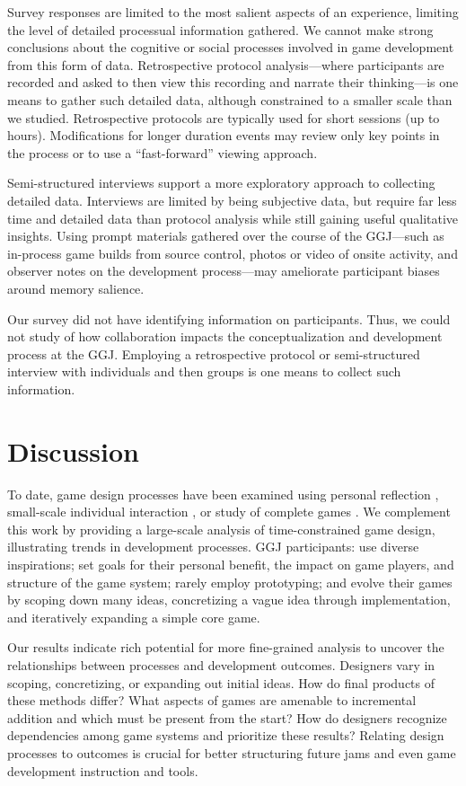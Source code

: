 \documentclass{sig-alternate}
\begin{document}
Survey responses are limited to the most salient aspects of an experience, limiting the level of detailed processual information gathered. We cannot make strong conclusions about the cognitive or social processes involved in game development from this form of data. Retrospective protocol analysis---where participants are recorded and asked to then view this recording and narrate their thinking---is one means to gather such detailed data, although constrained to a smaller scale than we studied. Retrospective protocols are typically used for short sessions (up to hours). Modifications for longer duration events may review only key points in the process or to use a ``fast-forward'' viewing approach. 

Semi-structured interviews support a more exploratory approach to collecting detailed data. Interviews are limited by being subjective data, but require far less time and detailed data than protocol analysis while still gaining useful qualitative insights. Using prompt materials gathered over the course of the GGJ---such as in-process game builds from source control, photos or video of onsite activity, and observer notes on the development process---may ameliorate participant biases around memory salience.

Our survey did not have identifying information on participants. Thus, we could not study of how collaboration impacts the conceptualization and development process at the GGJ. Employing a retrospective protocol or semi-structured interview with individuals and then groups is one means to collect such information.


\section{Discussion}
To date, game design processes have been examined using personal reflection \cite{anthropy2012:zinesters,hunicke2004:mda}, small-scale individual interaction \cite{nelson2009:reqanal}, or study of complete games \cite{bogost2011:howto}. We complement this work by providing a large-scale analysis of time-constrained game design, illustrating trends in development processes. GGJ participants: use diverse inspirations; set goals for their personal benefit, the impact on game players, and structure of the game system; rarely employ prototyping; and evolve their games by scoping down many ideas, concretizing a vague idea through implementation, and iteratively expanding a simple core game.

Our results indicate rich potential for more fine-grained analysis to uncover the relationships between processes and development outcomes. Designers vary in scoping, concretizing, or expanding out initial ideas. How do final products of these methods differ? What aspects of games are amenable to incremental addition and which must be present from the start? How do designers recognize dependencies among game systems and prioritize these results? Relating design processes to outcomes is crucial for better structuring future jams and even game development instruction and tools.
\end{document}
